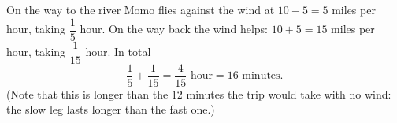 On the way to the river Momo flies against the wind at $10-5=5$ miles per hour, taking $\dfrac{1}{5}$ hour. On the way back the wind helps: $10+5=15$ miles per hour, taking $\dfrac{1}{15}$ hour. In total
\[\dfrac{1}{5}+\dfrac{1}{15}=\dfrac{4}{15}\text{ hour}=\boxed{16\text{ minutes}}.\]
(Note that this is longer than the $12$ minutes the trip would take with no wind: the slow leg lasts longer than the fast one.)
